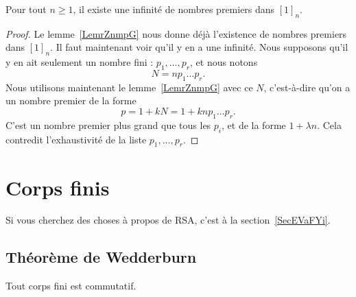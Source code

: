 \begin{theorem}    \label{ThoxwTjcl}
	Pour tout \( n\geq 1\), il existe une infinité de nombres premiers dans \( [1]_n\).
\end{theorem}

\begin{proof}
	Le lemme~\ref{LemrZnmpG} nous donne déjà l'existence de nombres premiers dans \( [1]_n\). Il faut maintenant voir qu'il y en a une infinité. Nous supposons qu'il y en ait seulement un nombre fini : \( p_1,\ldots, p_r\), et nous notons
	\begin{equation}
		N=np_1\ldots p_r.
	\end{equation}
	Nous utilisons maintenant le lemme~\ref{LemrZnmpG} avec ce \( N\), c'est-à-dire qu'on a un nombre premier de la forme
	\begin{equation}
		p=1+kN=1+knp_1\ldots p_r.
	\end{equation}
	C'est un nombre premier plus grand que tous les \( p_i\), et de la forme \( 1+\lambda n\). Cela contredit l'exhaustivité de la liste \( p_1,\ldots, p_r\).
\end{proof}

\section{Corps finis}
\label{SecCorpsFinizkAcbS}

Si vous cherchez des choses à propos de RSA, c'est à la section~\ref{SecEVaFYi}.

\subsection{Théorème de Wedderburn}

\begin{theorem}    \label{ThoMncIWA}
	Tout corps fini est commutatif.
\end{theorem}

